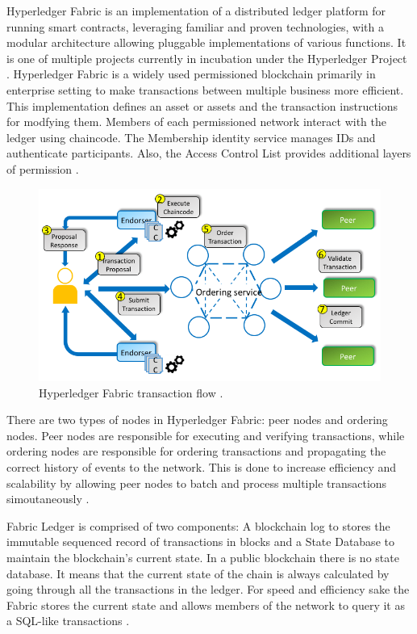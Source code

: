 Hyperledger Fabric is an implementation of a distributed ledger platform for running smart contracts, leveraging familiar and proven technologies, with a modular architecture allowing pluggable implementations of various functions. It is one of multiple projects currently in incubation under the Hyperledger Project \cite{cachin2016architecture}. Hyperledger Fabric is a widely used permissioned blockchain primarily in enterprise setting to make transactions between multiple business more efficient. This implementation defines an asset or assets and the transaction instructions for modfying them. Members of each permissioned network interact with the ledger using chaincode. The Membership identity service manages IDs and authenticate participants. Also, the Access Control List provides additional layers of permission \cite{blockgeeks2018deeper}.

\begin{figure}[htbp]
\begin{center}
  \includegraphics[scale=0.45]{images/Hyperledger-Fabric-high-level-transaction-flow.png}
\caption{Hyperledger Fabric  transaction flow \cite{manevich2018service}.}
\label{fig:hyperledgerFlow}
\end{center}
\end{figure}

There are two types of nodes in Hyperledger Fabric: peer nodes and ordering nodes. Peer nodes are responsible for executing and verifying transactions, while ordering nodes are responsible for ordering transactions and propagating the correct history of events to the network. This is done to increase efficiency and scalability by allowing peer nodes to batch and process multiple transactions simoutaneously \cite{buterin2016smart}. 

Fabric Ledger is comprised of two components: A blockchain log to stores the immutable sequenced record of transactions in blocks and a State Database to maintain the blockchain's current state. In a public blockchain there is no state database. It means that the current state of the chain is always calculated by going through all the transactions in the ledger. For speed and efficiency sake the Fabric stores the current state  and allows members of the network to query it as a SQL-like transactions \cite{blockgeeks2016blockchain}. 

